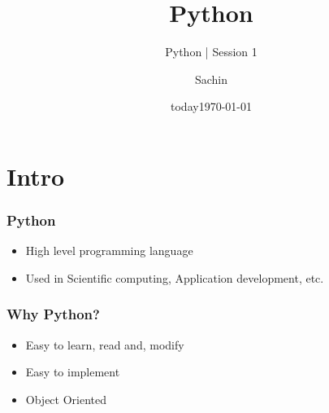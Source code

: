 \documentclass[bigger, presentation]{beamer}
\date{today}
\subtitle{Python | Session 1}
\title{Python}
\author{Sachin}
\date{\today}
\begin{document}
\maketitle

\section{Intro}
\label{sec-1}
\begin{frame}
\frametitle{Python}
\label{sec-1-1}


\begin{itemize}
\item High level programming language
\item Used in Scientific computing, Application development, etc.
\end{itemize}
\end{frame}
\begin{frame}
\frametitle{Why Python?}
\label{sec-1-2}


\begin{itemize}
\item Easy to learn, read and, modify
\item Easy to implement
\item Object Oriented
\end{itemize}
\end{frame}
\end{document}
